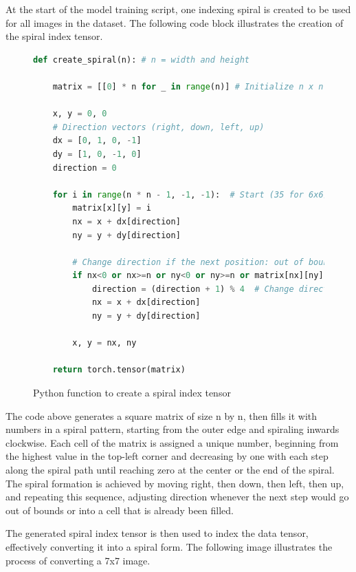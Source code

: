     At the start of the model training script, one indexing spiral is created to be used for all images in the dataset. The following code block illustrates the creation of the spiral index tensor.

\begin{figure}[H]
\centering
\begin{lstlisting}[language=Python]
def create_spiral(n): # n = width and height
    
    matrix = [[0] * n for _ in range(n)] # Initialize n x n matrix

    x, y = 0, 0
    # Direction vectors (right, down, left, up)
    dx = [0, 1, 0, -1]
    dy = [1, 0, -1, 0]
    direction = 0

    for i in range(n * n - 1, -1, -1):  # Start (35 for 6x6)
        matrix[x][y] = i
        nx = x + dx[direction]
        ny = y + dy[direction]

        # Change direction if the next position: out of bounds or filled
        if nx<0 or nx>=n or ny<0 or ny>=n or matrix[nx][ny]!=0:
            direction = (direction + 1) % 4  # Change direction
            nx = x + dx[direction]
            ny = y + dy[direction]

        x, y = nx, ny
    
    return torch.tensor(matrix)
\end{lstlisting}
\caption{Python function to create a spiral index tensor}
\label{fig:spiral_matrix}
\end{figure}

    The code above generates a square matrix of size n by n, then fills it with numbers in a spiral pattern, starting from the outer edge and spiraling inwards clockwise. Each cell of the matrix is assigned a unique number, beginning from the highest value in the top-left corner and decreasing by one with each step along the spiral path until reaching zero at the center or the end of the spiral. The spiral formation is achieved by moving right, then down, then left, then up, and repeating this sequence, adjusting direction whenever the next step would go out of bounds or into a cell that is already been filled.

    The generated spiral index tensor is then used to index the data tensor, effectively converting it into a spiral form. The following image illustrates the process of converting a 7x7 image.
    
